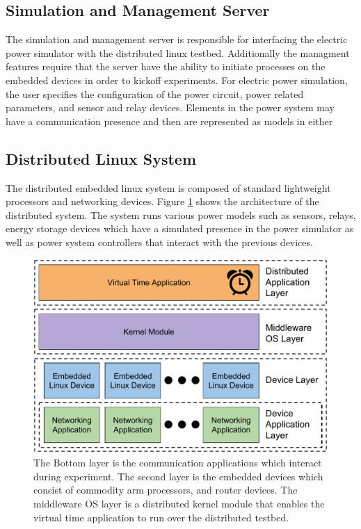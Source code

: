 \subsection{Simulation and Management Server}
The simulation and management server is responsible for interfacing the electric power simulator with the distributed linux testbed. Additionally the managment features require that the server have the ability to initiate processes on the embedded devices in order to kickoff experiments. For electric power simulation, the user specifies the configuration of the power circuit, power related parameters, and sensor and relay devices. Elements in the power system may have a communication presence and then are represented as models in either

\subsection{Distributed Linux System}

The distributed embedded linux system is composed of standard lightweight processors and networking devices. Figure \ref{env} shows the architecture of the distributed system. The system runs various power models such as sensors, relays, energy storage devices which have a simulated presence in the power simulator as well as power system controllers that interact with the previous devices.

\begin{figure}
  \centering
  \label{env}
  \includegraphics[scale=0.48]{Distributed_environment.pdf}
  \caption{
    The Bottom layer is the communication applications which interact during experiment. The second layer is the embedded devices which consist of commodity arm processors, and router devices. The middleware OS layer is a distributed kernel module that enables the virtual time application to run over the distributed testbed.
    }
\end{figure}

